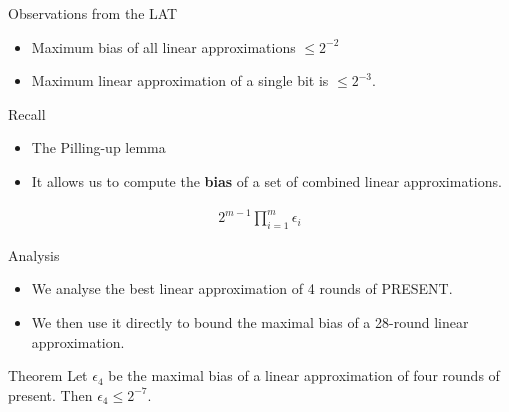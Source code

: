 \begin{frame}{Observations from the LAT}
\begin{itemize}
    \item Maximum bias of all linear approximations $ \leq 2^{-2}$
    \item Maximum linear approximation of a single bit is $ \leq 2^{-3}$.
\end{itemize}
\begin{block}{Recall}
        \begin{itemize}
            \item The Pilling-up lemma
            \item It allows us to compute the \textbf{bias} of a set of combined linear approximations.
        \end{itemize}
        \begin{eqnarray*}
         2^{m-1}\prod_{i=1}^{m} \epsilon_i
        \end{eqnarray*}
    \end{block}
\end{frame}

\begin{frame}{Analysis}
\begin{itemize}
    \item We analyse the best linear approximation of 4 rounds of PRESENT.
    \item We then use it directly to bound the maximal bias of a 28-round linear approximation.
\end{itemize}
\begin{block}{Theorem}
        Let $\epsilon_4$ be the maximal bias of a linear approximation of four rounds of present. Then $\epsilon_4 \leq 2^{-7}$.
    \end{block}
\end{frame}

